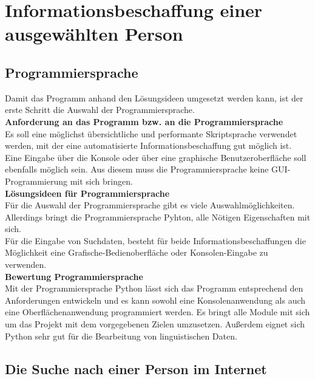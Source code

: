 
\chapter{Informationsbeschaffung einer ausgewählten Person}  %
\label{cha:Informationsbeschaffung einer ausgewählten Person} %

\section{Programmiersprache}
Damit das Programm anhand den Lösungsideen umgesetzt werden kann, ist der erste Schritt die Auswahl der Programmiersprache.\\
\textbf{Anforderung an das Programm bzw. an die Programmiersprache}\\
	Es soll eine möglichst übersichtliche und performante Skriptsprache verwendet werden, mit der eine automatisierte Informationsbeschaffung gut möglich ist. Eine Eingabe über die Konsole oder über eine graphische Benutzeroberfläche soll ebenfalls möglich sein. Aus diesem muss die Programmiersprache keine GUI-Programmierung mit sich bringen.\\
\textbf{Lösungsideen für Programmiersprache}\\
	Für die Auswahl der Programmiersprache gibt es viele Auswahlmöglichkeiten. Allerdings bringt die Programmiersprache Pyhton, alle Nötigen Eigenschaften mit sich.\\
	Für die Eingabe von Suchdaten, besteht für beide Informationsbeschaffungen die Möglichkeit eine Grafische-Bedienoberfläche oder Konsolen-Eingabe zu verwenden.\\
\textbf{Bewertung Programmiersprache}\\
	Mit der Programmiersprache Python lässt sich das Programm entsprechend den Anforderungen entwickeln und es kann sowohl eine Konsolenanwendung als auch eine Oberflächenanwendung programmiert werden. Es bringt alle Module mit sich um das Projekt mit dem vorgegebenen Zielen umzusetzen. Außerdem eignet sich Python sehr gut für die Bearbeitung von linguistischen Daten. \cite{bird2009natural}
\section{Die Suche nach einer Person im Internet}
